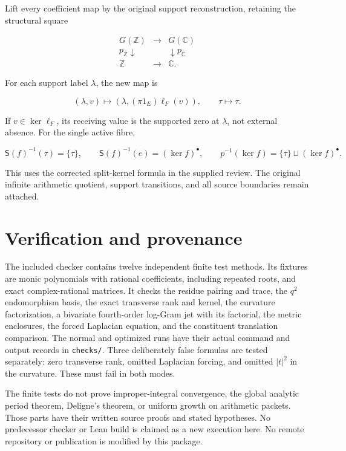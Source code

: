 \documentclass[
  11pt,
]{article}
\begin{document}
Lift every coefficient map by the original support reconstruction,
retaining the structural square

\[
\begin{array}{ccc}
G(\mathbb Z)&\longrightarrow&G(\mathbb C)\\
p_{\mathbb Z}\downarrow&&\downarrow p_{\mathbb C}\\
\mathbb Z&\longrightarrow&\mathbb C.
\end{array}
\tag{RC51}
\]

For each support label \(\lambda\), the new map is

\[
(\lambda,v)\longmapsto
(\lambda,(\pi1_E)\ell_F(v)),\qquad \tau\longmapsto\tau.
\tag{RC52}
\]

If \(v\in\ker\ell_F\), its receiving value is the supported zero at
\(\lambda\), not external absence. For the single active fibre,

\[
\mathsf S(f)^{-1}(\tau)=\{\tau\},\qquad
\mathsf S(f)^{-1}(e)=(\ker f)^\bullet,
\qquad p^{-1}(\ker f)=\{\tau\}\sqcup(\ker f)^\bullet.
\tag{RC53}
\]

This uses the corrected split-kernel formula in the supplied review. The
original infinite arithmetic quotient, support transitions, and all
source boundaries remain attached.

\section{Verification and provenance}\label{verification-and-provenance}

The included checker contains twelve independent finite test methods.
Its fixtures are monic polynomials with rational coefficients, including
repeated roots, and exact complex-rational matrices. It checks the
residue pairing and trace, the \(q^2\) endomorphism basis, the exact
transverse rank and kernel, the curvature factorization, a bivariate
fourth-order log-Gram jet with its factorial, the metric enclosures, the
forced Laplacian equation, and the constituent translation comparison.
The normal and optimized runs have their actual command and output
records in \texttt{checks/}. Three deliberately false formulas are
tested separately: zero transverse rank, omitted Laplacian forcing, and
omitted \(|t|^2\) in the curvature. These must fail in both modes.

The finite tests do not prove improper-integral convergence, the global
analytic period theorem, Deligne's theorem, or uniform growth on
arithmetic packets. Those parts have their written source proofs and
stated hypotheses. No predecessor checker or Lean build is claimed as a
new execution here. No remote repository or publication is modified by
this package.
\end{document}
